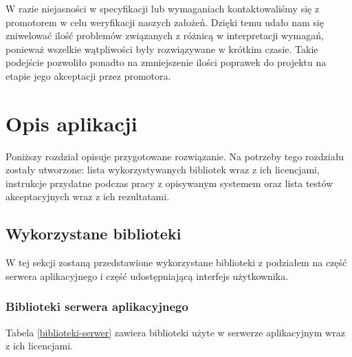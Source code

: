 \documentclass[a4paper,11pt,twoside]{report}
\theoremstyle{definition}
\begin{document}
    W razie niejasności w specyfikacji lub wymaganiach kontaktowaliśmy się z promotorem w celu
    weryfikacji naszych założeń.
    Dzięki temu udało nam się zniwelować ilość problemów związanych z różnicą w interpretacji wymagań,
    ponieważ wszelkie wątpliwości były rozwiązywane w krótkim czasie.
    Takie podejście pozwoliło ponadto na zmniejszenie ilości poprawek do projektu na etapie jego
    akceptacji przez promotora.


\chapter{Opis aplikacji}
    Poniższy rozdział opisuje przygotowane rozwiązanie. Na potrzeby tego rozdziału zostały utworzone: lista wykorzystywanych bibliotek wraz z ich licencjami, instrukcje przydatne podczas pracy z opisywanym systemem oraz lista testów akceptacyjnych wraz z ich rezultatami.
    
    \section{Wykorzystane biblioteki}
         W tej sekcji zostaną przedstawione wykorzystane biblioteki z podziałem na część serwera aplikacyjnego i część udostępniającą interfejs użytkownika.
        
        \subsection{Biblioteki serwera aplikacyjnego}
        Tabela \ref{biblioteki-serwer} zawiera biblioteki użyte w serwerze aplikacyjnym wraz z ich licencjami.
        
\end{document}
